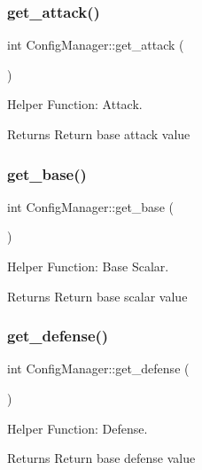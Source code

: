 \subsubsection{\texorpdfstring{get\+\_\+attack()}{get\_attack()}}
{\footnotesize\ttfamily int Config\+Manager\+::get\+\_\+attack (\begin{DoxyParamCaption}{ }\end{DoxyParamCaption})}



Helper Function\+: Attack. 

\begin{DoxyReturn}{Returns}
Return base attack value 
\end{DoxyReturn}
\mbox{\label{classConfigManager_a57b0095138267495fa6da6c2147bf70e}} 
\subsubsection{\texorpdfstring{get\+\_\+base()}{get\_base()}}
{\footnotesize\ttfamily int Config\+Manager\+::get\+\_\+base (\begin{DoxyParamCaption}{ }\end{DoxyParamCaption})}



Helper Function\+: Base Scalar. 

\begin{DoxyReturn}{Returns}
Return base scalar value 
\end{DoxyReturn}
\mbox{\label{classConfigManager_a7da8012593610ab3558103a5f8e0a3cb}} 
\subsubsection{\texorpdfstring{get\+\_\+defense()}{get\_defense()}}
{\footnotesize\ttfamily int Config\+Manager\+::get\+\_\+defense (\begin{DoxyParamCaption}{ }\end{DoxyParamCaption})}



Helper Function\+: Defense. 

\begin{DoxyReturn}{Returns}
Return base defense value 
\end{DoxyReturn}
\mbox{\label{classConfigManager_a93ea2b6222eb97fd706db88f36e3d237}} 
